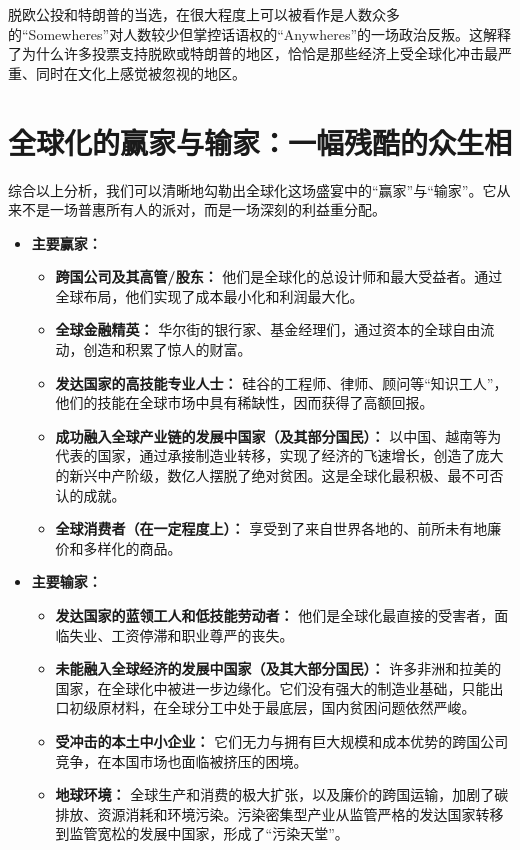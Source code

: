 脱欧公投和特朗普的当选，在很大程度上可以被看作是人数众多的“Somewheres”对人数较少但掌控话语权的“Anywheres”的一场政治反叛。这解释了为什么许多投票支持脱欧或特朗普的地区，恰恰是那些经济上受全球化冲击最严重、同时在文化上感觉被忽视的地区。

\section{全球化的赢家与输家：一幅残酷的众生相}

综合以上分析，我们可以清晰地勾勒出全球化这场盛宴中的“赢家”与“输家”。它从来不是一场普惠所有人的派对，而是一场深刻的利益重分配。

\begin{itemize}
\item \textbf{主要赢家：}
\begin{itemize}
\item \textbf{跨国公司及其高管/股东：} 他们是全球化的总设计师和最大受益者。通过全球布局，他们实现了成本最小化和利润最大化。
\item \textbf{全球金融精英：} 华尔街的银行家、基金经理们，通过资本的全球自由流动，创造和积累了惊人的财富。
\item \textbf{发达国家的高技能专业人士：} 硅谷的工程师、律师、顾问等“知识工人”，他们的技能在全球市场中具有稀缺性，因而获得了高额回报。
\item \textbf{成功融入全球产业链的发展中国家（及其部分国民）：} 以中国、越南等为代表的国家，通过承接制造业转移，实现了经济的飞速增长，创造了庞大的新兴中产阶级，数亿人摆脱了绝对贫困。这是全球化最积极、最不可否认的成就。
\item \textbf{全球消费者（在一定程度上）：} 享受到了来自世界各地的、前所未有地廉价和多样化的商品。
\end{itemize}

\item \textbf{主要输家：}
\begin{itemize}
\item \textbf{发达国家的蓝领工人和低技能劳动者：} 他们是全球化最直接的受害者，面临失业、工资停滞和职业尊严的丧失。
\item \textbf{未能融入全球经济的发展中国家（及其大部分国民）：} 许多非洲和拉美的国家，在全球化中被进一步边缘化。它们没有强大的制造业基础，只能出口初级原材料，在全球分工中处于最底层，国内贫困问题依然严峻。
\item \textbf{受冲击的本土中小企业：} 它们无力与拥有巨大规模和成本优势的跨国公司竞争，在本国市场也面临被挤压的困境。
\item \textbf{地球环境：} 全球生产和消费的极大扩张，以及廉价的跨国运输，加剧了碳排放、资源消耗和环境污染。污染密集型产业从监管严格的发达国家转移到监管宽松的发展中国家，形成了“污染天堂”。
\end{itemize}
\end{itemize}

